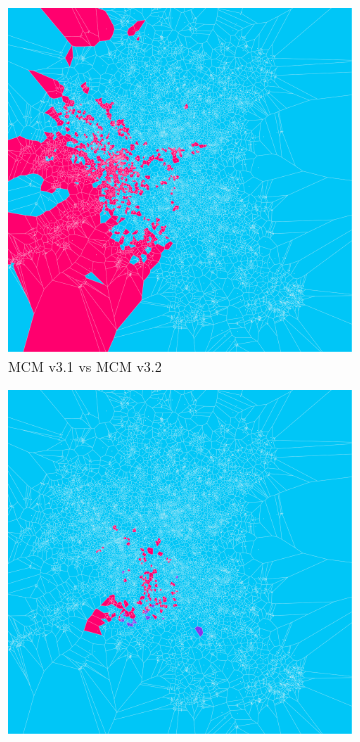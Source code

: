 \begin{figure}[H]
     \centering
    \begin{subfigure}[b]{.49\textwidth}
         \centering \includegraphics[width=\textwidth]{m31_m32.png}
         \caption{MCM v3.1 vs MCM v3.2}
         \label{fig:m1to2}
     \end{subfigure}
     \begin{subfigure}[b]{.49\textwidth}
         \centering \includegraphics[width=\textwidth]{m32_m33.png}

\end{subfigure}
\end{figure}
